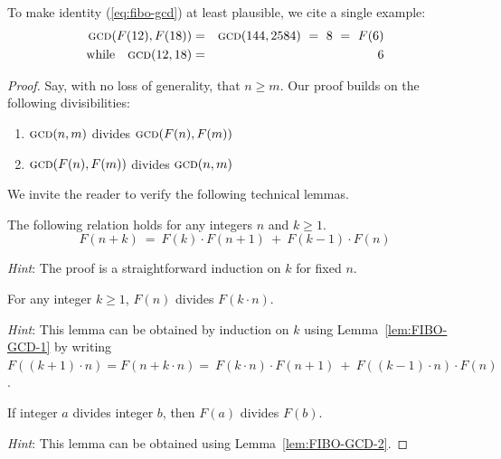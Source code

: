 \smallskip

\noindent
To make identity (\ref{eq:fibo-gcd}) at least plausible, we cite a single example:
\begin{eqnarray*}
\mbox{\sc gcd}(F(12), F(18)) & = & \mbox{\sc gcd}(144,2584) \ = \ 8 \ = \ F(6) \\
\mbox{while } \ \ \mbox{\sc gcd}(12,18) & = & 6
\end{eqnarray*}

\medskip

\begin{proof}
Say, with no loss of generality,  that $n \geq m$.  Our proof builds on the following divisibilities:
\begin{enumerate}
\item
$\mbox{\sc gcd}(n,m)$ divides $\mbox{\sc gcd}(F(n), F(m))$

\medskip\item
$\mbox{\sc gcd}(F(n), F(m))$ divides $\mbox{\sc gcd}(n,m)$
\end{enumerate}

\smallskip

\noindent
We invite the reader to verify the following technical lemmas.


\begin{lemma}
\label{lem:FIBO-GCD-1}
The following relation holds for any integers $n$ and $k \geq 1$.
\[  F(n+k) \ = \ F(k) \cdot F(n+1) \ + \ F(k-1) \cdot F(n) \] 
\end{lemma}

\noindent
{\em Hint}: The proof is a straightforward induction on $k$ for fixed $n$.

\begin{lemma}
\label{lem:FIBO-GCD-2}
For any integer $k \geq 1$, $F(n)$ divides $F(k \cdot n)$.
\end{lemma}

\noindent
{\em Hint}: This lemma can be obtained by induction on $k$ using Lemma~\ref{lem:FIBO-GCD-1}
by writing $F((k+1) \cdot n) = F(n + k \cdot n) = \ F(k \cdot n) \cdot F(n+1) \ + \ F((k-1) \cdot n) \cdot F(n)$.

\begin{lemma}
\label{lem:FIBO-GCD-3}
If integer $a$ divides integer $b$, then $F(a)$ divides $F(b)$.
\end{lemma}

\noindent
{\em Hint}: This lemma can be obtained using Lemma~\ref{lem:FIBO-GCD-2}.


\end{proof}
